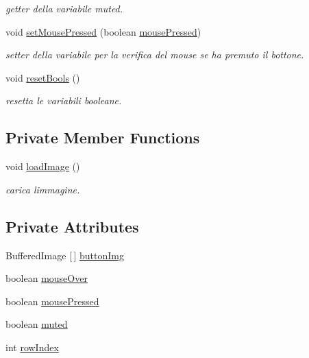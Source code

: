 \begin{DoxyCompactItemize}
\begin{DoxyCompactList}\small\item\em getter della variabile muted. \end{DoxyCompactList}\item 
void \hyperlink{classui_1_1_ush_button_ad6f3328519bbc954f7973bc885d088d8}{set\+Mouse\+Pressed} (boolean \hyperlink{classui_1_1_ush_button_aab61081d8be401bc3a4081ae11fb50d9}{mouse\+Pressed})
\begin{DoxyCompactList}\small\item\em setter della variabile per la verifica del mouse se ha premuto il bottone. \end{DoxyCompactList}\item 
void \hyperlink{classui_1_1_ush_button_a4506144774b5a18385cf2eb0f4ff5e42}{reset\+Bools} ()
\begin{DoxyCompactList}\small\item\em resetta le variabili booleane. \end{DoxyCompactList}\end{DoxyCompactItemize}
\subsection*{Private Member Functions}
\begin{DoxyCompactItemize}
\item 
void \hyperlink{classui_1_1_ush_button_aeee4cf1bbe51fdc2f9c344e4c20cee76}{load\+Image} ()
\begin{DoxyCompactList}\small\item\em carica l\textquotesingle{}immagine. \end{DoxyCompactList}\end{DoxyCompactItemize}
\subsection*{Private Attributes}
\begin{DoxyCompactItemize}
\item 
Buffered\+Image \mbox{[}$\,$\mbox{]} \hyperlink{classui_1_1_ush_button_abd6466e77533efc1594809092e232182}{button\+Img}
\item 
boolean \hyperlink{classui_1_1_ush_button_a9659ce063fb98f78eefb2ee148d1e9fc}{mouse\+Over}
\item 
boolean \hyperlink{classui_1_1_ush_button_aab61081d8be401bc3a4081ae11fb50d9}{mouse\+Pressed}
\item 
boolean \hyperlink{classui_1_1_ush_button_a1d5ea61013609113129f4a6aaa99c5cd}{muted}
\item 
int \hyperlink{classui_1_1_ush_button_aa472bc4708470ef0afc61d3c18896ec9}{row\+Index}
\end{DoxyCompactItemize}
